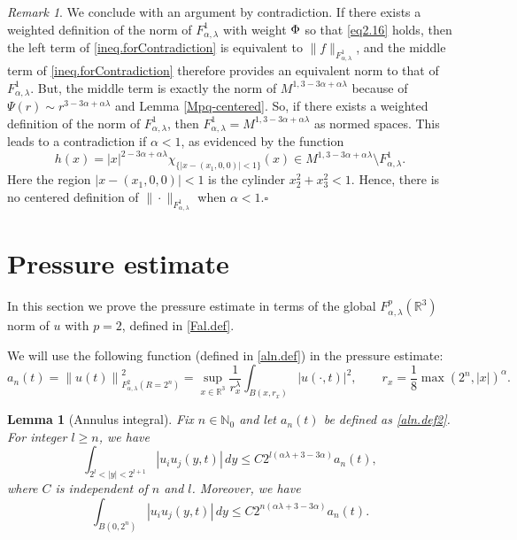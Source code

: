 \documentclass[11pt]{article}
\numberwithin{equation}{section}
\newtheorem{lem}[thm]{Lemma}
\theoremstyle{remark}
\newtheorem{remark}[thm]{Remark}
\theoremstyle{definition}
\newcommand{\norm}[1]{\left \| #1 \right \|}
\newcommand{\R}{\mathbb{R}}
\newcommand\al{\alpha}
\newcommand\la{\lambda}
\newcommand{\NN}{\mathbb{N}}
\newcommand{\EQ}[1]{\begin{equation} #1 \end{equation}}
\begin{document}
\begin{remark}
We conclude with an argument by contradiction.  If there exists a weighted definition of the norm of $F^{1}_{\al,\la}$ with weight $\Phi$ {so that \eqref{eq2.16} holds}, then 
{the left term of \eqref{ineq.forContradiction} is equivalent to $\|f\|_{F^1_{\al,\la}}$,}
%
and the middle term of \eqref{ineq.forContradiction} therefore provides an equivalent norm to that of $F^{1}_{\al,\la}$. But, the middle term is exactly the norm of $M^{1,3-3\al +\al\la}$ {because of $\Psi(r) \sim  r^{3-3\al +\al \la}$ and Lemma  \ref{Mpq-centered}.} So, if there exists a weighted definition of the norm of $F^{1}_{\al,\la}$, then $F^{1}_{\al,\la}= M^{1,3-3\al +\al\la}$ as normed spaces.
This leads to a contradiction if $\al<1$, as evidenced by the function
\[
h(x)= |x|^{2-3\al +\al\la} \chi_{\{|x - (x_1,0,0)|<1\}}(x) \in M^{1,3-3\al +\al\la}\setminus F^1_{\al,\la}.
\]
{Here the region $|x - (x_1,0,0)|<1$ is the cylinder $x^2_2+x_3^2<1$.}
Hence, there is no centered definition of $\|\cdot\|_{F^1_{\al,\la}}$ when $\al<1$.\hfill $\square$ 
\end{remark}


%
\section{Pressure estimate}\label{sec3}

In this section we prove the pressure estimate in terms of the global $F^p_{\al,\la}(\R^3)$ norm of $u$ with $p=2$,  %
defined in \eqref{Fal.def}.


We will use the following function (defined in \eqref{aln.def}) in the pressure estimate:
\EQ{\label{aln.def2}
a_n(t)=\norm{u(t)}_{F_{\al,\la}^{2}(R=2^n)}^2 =
\sup_{x\in\R^3} \frac1{r_x^\la}\int_{B(x, r_x)} |u(\cdot,t)|^2 ,\qquad r_x=\frac18\max(2^n,|x|)^{\al}.
}

\begin{lem}[Annulus integral]\label{annulas-integral}
Fix $n \in \NN_0$ and let $a_n(t)$ be defined as \eqref{aln.def2}. For integer $l\ge n$,
we have
\EQ{\label{th:annulas-integral}
 \int_{2^l< |y|<2^{l+1}}   |u_iu_j(y,t)|\,dy
  \le C  2^{l(\al \la +3-3\al)}   a_n(t) ,
}
where $C$ is independent of $n$ and $l$. Moreover, we have
\EQ{\label{th:ball-integral}
\int_{B(0,2^n)}|u_iu_j(y,t)|\,dy
  \le C  2^{n(\al \la +3-3\al)}   a_n(t).
}
\end{lem}
\end{document}
